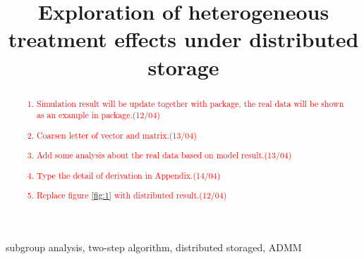 \documentclass[review]{elsarticle}
\begin{document}
\begin{frontmatter}

\title{Exploration of heterogeneous treatment effects under distributed storage }

\author{}

\begin{abstract}
\textcolor{red}{\begin{enumerate}
		\item Simulation result will be update together with package, the real data will be shown as an example in package.(12/04)
		\item Coarsen letter of vector and matrix.(13/04)
		\item Add some analysis about the real data based on model result.(13/04)
		\item Type the detail of derivation in Appendix.(14/04)
		\item  Replace figure \ref{fig:1} with distributed result.(12/04)
\end{enumerate}} 
\end{abstract}

\begin{keyword}
subgroup analysis, two-step algorithm, distributed storaged, ADMM
\end{keyword}

\end{frontmatter}

\linenumbers
\end{document}
